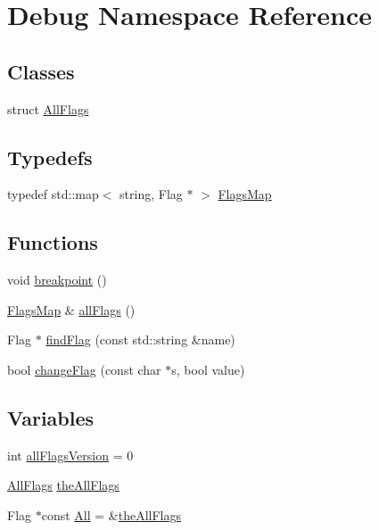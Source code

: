 \hypertarget{namespaceDebug}{
\section{Debug Namespace Reference}
\label{namespaceDebug}
}
\subsection*{Classes}
\begin{DoxyCompactItemize}
\item 
struct \hyperlink{structDebug_1_1AllFlags}{AllFlags}
\end{DoxyCompactItemize}
\subsection*{Typedefs}
\begin{DoxyCompactItemize}
\item 
typedef std::map$<$ string, Flag $\ast$ $>$ \hyperlink{namespaceDebug_ac1a92d7a229e02f4e3081653c52e821d}{FlagsMap}
\end{DoxyCompactItemize}
\subsection*{Functions}
\begin{DoxyCompactItemize}
\item 
void \hyperlink{namespaceDebug_a3a24898e3ca48ef89e2029ab6e43665c}{breakpoint} ()
\item 
\hyperlink{namespaceDebug_ac1a92d7a229e02f4e3081653c52e821d}{FlagsMap} \& \hyperlink{namespaceDebug_a2e5d5eb12f0767ef733518a07a287e43}{allFlags} ()
\item 
Flag $\ast$ \hyperlink{namespaceDebug_a09cf38987e4932dd5e0bc71954f2b637}{findFlag} (const std::string \&name)
\item 
bool \hyperlink{namespaceDebug_ae27d4c45a021062ae81d1321c3490326}{changeFlag} (const char $\ast$s, bool value)
\end{DoxyCompactItemize}
\subsection*{Variables}
\begin{DoxyCompactItemize}
\item 
int \hyperlink{namespaceDebug_a6eec1fa1c405c62968ca11295758d429}{allFlagsVersion} = 0
\item 
\hyperlink{structDebug_1_1AllFlags}{AllFlags} \hyperlink{namespaceDebug_ac230a2b949dcfde863ac34d10d5b92ea}{theAllFlags}
\item 
Flag $\ast$const \hyperlink{namespaceDebug_abe73cacba918a5c088ae708162e0cfe2}{All} = \&\hyperlink{namespaceDebug_ac230a2b949dcfde863ac34d10d5b92ea}{theAllFlags}
\end{DoxyCompactItemize}


